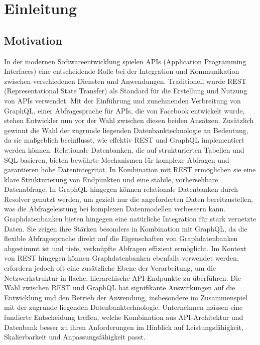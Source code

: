 \chapter{Einleitung} %
\label{sec:einleitung}
\section{Motivation} %
\label{sec:motivation}
In der modernen Softwareentwicklung spielen APIs (Application Programming Interfaces) eine entscheidende Rolle bei der Integration und Kommunikation zwischen verschiedenen Diensten und Anwendungen. Traditionell wurde REST (Representational State Transfer) als Standard für die Erstellung und Nutzung von APIs verwendet. Mit der Einführung und zunehmenden Verbreitung von GraphQL, einer Abfragesprache für APIs, die von Facebook entwickelt wurde, stehen Entwickler nun vor der Wahl zwischen diesen beiden Ansätzen.
Zusätzlich gewinnt die Wahl der zugrunde liegenden Datenbanktechnologie an Bedeutung, da sie maßgeblich beeinflusst, wie effektiv REST und GraphQL implementiert werden können. Relationale Datenbanken, die auf strukturierten Tabellen und SQL basieren, bieten bewährte Mechanismen für komplexe Abfragen und garantieren hohe Datenintegrität. In Kombination mit REST ermöglichen sie eine klare Strukturierung von Endpunkten und eine stabile, vorhersehbare Datenabfrage. In GraphQL hingegen können relationale Datenbanken durch Resolver genutzt werden, um gezielt nur die angeforderten Daten bereitzustellen, was die Abfrageleistung bei komplexen Datenmodellen verbessern kann.
Graphdatenbanken bieten hingegen eine natürliche Integration für stark vernetzte Daten. Sie zeigen ihre Stärken besonders in Kombination mit GraphQL, da die flexible Abfragesprache direkt auf die Eigenschaften von Graphdatenbanken abgestimmt ist und tiefe, verknüpfte Abfragen effizient ermöglicht. Im Kontext von REST hingegen können Graphdatenbanken ebenfalls verwendet werden, erfordern jedoch oft eine zusätzliche Ebene der Verarbeitung, um die Netzwerkstruktur in flache, hierarchische API-Endpunkte zu überführen. Die Wahl zwischen REST und GraphQL hat signifikante Auswirkungen auf die Entwicklung und den Betrieb der Anwendung, insbesondere im Zusammenspiel mit der zugrunde liegenden Datenbanktechnologie. Unternehmen müssen eine fundierte Entscheidung treffen, welche Kombination aus API-Architektur und Datenbank besser zu ihren Anforderungen im Hinblick auf Leistungsfähigkeit, Skalierbarkeit und Anpassungsfähigkeit passt.

